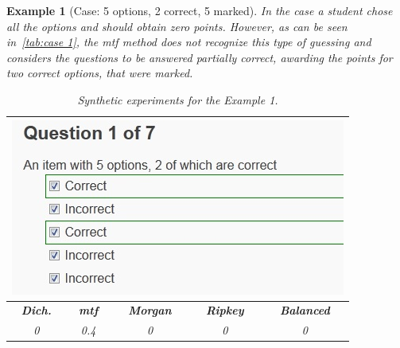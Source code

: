 \documentclass[PhD, Submit, ngerman,UKenglish,table]{scrbook}
\newtheorem{example}{Example}
\begin{document}
\begin{example}[Case: 5 options, 2 correct, 5 marked]
In the case a student chose all the options and should obtain zero points. 
However, as can be seen in~\autoref{tab:case 1}, the \gls{mtf} method does not recognize this type of guessing and considers the questions to be answered partially correct, awarding the points for two correct options, that were marked.

\begin{table}[!htb]
	\centering
	\begin{tabularx}{0.55\columnwidth}{c c c c c}  
	\toprule  
    \multicolumn{5}{c}{\includegraphics[width=0.4\columnwidth]{images/case1.jpg}}\\
    \midrule
    \textbf{Dich.}&\textbf{\gls{mtf}}&\textbf{Morgan}&\textbf{Ripkey}&\textbf{Balanced}\\
	\midrule
    0&0.4&0&0&0\\
	\bottomrule
    \end{tabularx}
	\caption{Synthetic experiments for the Example 1.}
	\label{tab:case 1}
\end{table}

\end{example}
\end{document}
